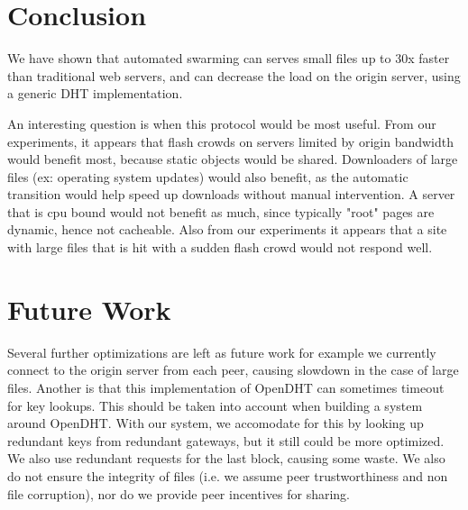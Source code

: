 \section{Conclusion}

We have shown that automated swarming can serves small files up to 30x faster than traditional web servers, and can decrease
the load on the origin server, using a generic DHT implementation.

An interesting question is when this protocol would be most useful. From our experiments, it appears that
flash crowds on servers limited by origin bandwidth would benefit most, because static objects would
be shared.  Downloaders of large files (ex: operating
system updates) would also benefit, as the automatic transition would help speed up downloads without
manual intervention.
A server that is cpu bound would not benefit as much, since typically "root" pages are dynamic, hence not cacheable.
Also from our experiments it appears that a site with large files that is hit with a sudden flash crowd would not respond well.

\section{Future Work}

Several further optimizations are left as future work for example we currently connect to the origin
server from each peer, causing slowdown in the case of large files.
Another is that this implementation of OpenDHT can sometimes timeout for key lookups. %
This should be taken into account when building a system around OpenDHT.
With our system, we accomodate for this by looking up redundant keys from redundant gateways, but it still
could be more optimized.
We also use redundant requests for the last block, causing some waste.  We also do not ensure the 
integrity of files (i.e. we assume peer trustworthiness and non file corruption), nor do we provide peer incentives for sharing.

